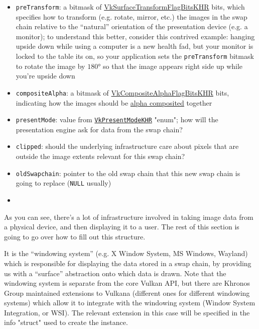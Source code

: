 \documentclass[12pt,letterpaper]{article}
\newcommand{\inquotes}[1]{``#1''}	%
\newcommand{\cil}[1]{\texttt{#1}}
\begin{document}
\begin{itemize}
		\item \cil{preTransform}: a bitmask of \href{http://vulkan-spec-chunked.ahcox.com/ch29s05.html#VkSurfaceTransformFlagBitsKHR}{VkSurfaceTransformFlagBitsKHR} bits, which specifies how to transform (e.g. rotate, mirror, etc.) the images in the swap chain relative to the \inquotes{natural} orientation of the presentation device (e.g. a monitor); to understand this better, consider this contrived example: hanging upside down while using a computer is a new health fad, but your monitor is locked to the table its on, so your application sets the \cil{preTransform} bitmask to rotate the image by $\ang{180}$ so that the image appears right side up while you're upside down
		
		\item \cil{compositeAlpha}: a bitmask of \href{http://vulkan-spec-chunked.ahcox.com/ch29s05.html#VkCompositeAlphaFlagBitsKHR}{VkCompositeAlphaFlagBitsKHR} bits, indicating how the images should be \href{https://en.wikipedia.org/wiki/Alpha_compositing}{alpha composited} together
		
		\item \cil{presentMode}: value from \href{http://vulkan-spec-chunked.ahcox.com/ch29s05.html#VkPresentModeKHR}{\cil{VkPresentModeKHR}} "enum"; how will the presentation engine ask for data from the swap chain?
		
		\item \cil{clipped}: should the underlying infrastructure care about pixels that are outside the image extents relevant for this swap chain?
		
		\item \cil{oldSwapchain}: pointer to the old swap chain that this new swap chain is going to replace (\cil{NULL} usually)
		\item 
	\end{itemize}
	
	As you can see, there's a lot of infrastructure involved in taking image data from a physical device, and then displaying it to a user. The rest of this section is going to go over how to fill out this structure.
	
	It is the \inquotes{windowing system} (e.g. X Window System, MS Windows, Wayland) which is responsible for displaying the data stored in a swap chain, by providing us with a \inquotes{surface} abstraction onto which data is drawn. Note that the windowing system is separate from the core Vulkan API, but there are Khronos Group maintained extensions to Vulkana (different ones for different windowing systems) which allow it to integrate with the windowing system (Window System Integration, or WSI). The relevant extension in this case will be specified in the info "struct" used to create the instance.
	
\end{document}
